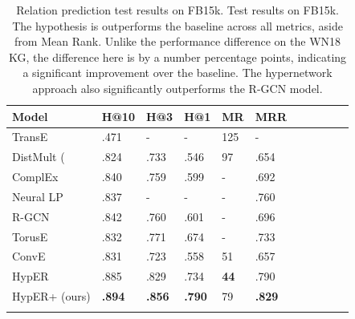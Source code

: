 \begin{table}
		\centering
		\begin{tabular}{lllllllllll}
  			\textbf{Model} & \textbf{H@10} & \textbf{H@3} & \textbf{H@1} & \textbf{MR} & \textbf{MRR} \\
  			\hline
  			TransE \unskip~\citep{bordes2013translating} & .471 & - & - & 125 & - \\
  			DistMult (\unskip~\citep{yang2014embedding} & .824 & .733 & .546 & 97 & .654 \\
  			ComplEx \unskip~\citep{trouillon2016complex} & .840 & .759 & .599 & - & .692 \\
  			Neural LP \unskip~\citep{yang2017differentiable} & .837 & - & - & - & .760 \\
			R-GCN \unskip~\citep{schlichtkrull2018modeling} & .842 & .760 & .601 & - & .696 \\
			TorusE \unskip~\citep{ebisu2018toruse} & .832 & .771 & .674 & - & .733\\
			ConvE \unskip~\citep{dettmers2018convolutional} & .831 & .723 & .558 & 51 & .657 \\
			HypER \unskip~\citep{balazevic2019hypernetwork} & .885 & .829 & .734 & \textbf{44} & .790 \\
  			\hline
  			HypER+ (ours) & \textbf{.894} & \textbf{.856} & \textbf{.790} & 79 & \textbf{.829} \\
			&
		\end{tabular}
		\captionsetup{justification=centering}
		\caption{Relation prediction test results on FB15k. Test results on FB15k. The hypothesis is outperforms the baseline across all metrics, aside from Mean Rank. Unlike the performance difference on the WN18 KG, the difference here is by a number percentage points, indicating a significant improvement over the baseline. The hypernetwork approach also significantly outperforms the R-GCN model.}
\end{table}



